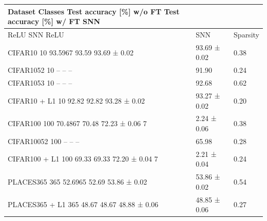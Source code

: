 \begin{tabular}{lll}
\toprule
Dataset Classes Test accuracy [\%] w/o FT Test accuracy [\%] w/ FT SNN &  &  \\
\midrule
ReLU SNN ReLU & SNN & Sparsity \\
CIFAR10 10 93.5967 93.59 93.69 ± 0.02 & 93.69 ± 0.02 & 0.38 \\
CIFAR1052 10 – – – & 91.90 & 0.24 \\
CIFAR1053 10 – – – & 92.68 & 0.62 \\
CIFAR10 + L1 10 92.82 92.82 93.28 ± 0.02 & 93.27 ± 0.02 & 0.20 \\
CIFAR100 100 70.4867 70.48 72.23 ± 0.06 7 & 2.24 ± 0.06 & 0.38 \\
CIFAR10052 100 – – – & 65.98 & 0.28 \\
CIFAR100 + L1 100 69.33 69.33 72.20 ± 0.04 7 & 2.21 ± 0.04 & 0.24 \\
PLACES365 365 52.6965 52.69 53.86 ± 0.02 & 53.86 ± 0.02 & 0.54 \\
PLACES365 + L1 365 48.67 48.67 48.88 ± 0.06 & 48.85 ± 0.06 & 0.27 \\
\bottomrule
\end{tabular}
